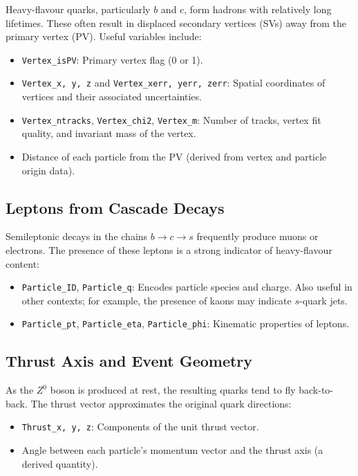 \documentclass[11pt]{article}
\begin{document}
Heavy-flavour quarks, particularly \( b \) and \( c \), form hadrons with relatively long lifetimes. These often result in displaced secondary vertices (SVs) away from the primary vertex (PV). Useful variables include:
\begin{itemize}
  \item \texttt{Vertex\_isPV}: Primary vertex flag (0 or 1).
  \item \texttt{Vertex\_x, y, z} and \texttt{Vertex\_xerr, yerr, zerr}: Spatial coordinates of vertices and their associated uncertainties.
  \item \texttt{Vertex\_ntracks}, \texttt{Vertex\_chi2}, \texttt{Vertex\_m}: Number of tracks, vertex fit quality, and invariant mass of the vertex.
  \item Distance of each particle from the PV (derived from vertex and particle origin data).
\end{itemize}

\subsection{Leptons from Cascade Decays}

Semileptonic decays in the chains \( b \rightarrow c \rightarrow s \) frequently produce muons or electrons. The presence of these leptons is a strong indicator of heavy-flavour content:
\begin{itemize}
  \item \texttt{Particle\_ID}, \texttt{Particle\_q}: Encodes particle species and charge. Also useful in other contexts; for example, the presence of kaons may indicate \( s \)-quark jets.
  \item \texttt{Particle\_pt}, \texttt{Particle\_eta}, \texttt{Particle\_phi}: Kinematic properties of leptons.
\end{itemize}

\subsection{Thrust Axis and Event Geometry}

As the \( Z^0 \) boson is produced at rest, the resulting quarks tend to fly back-to-back. The thrust vector approximates the original quark directions:
\begin{itemize}
  \item \texttt{Thrust\_x, y, z}: Components of the unit thrust vector.
  \item Angle between each particle’s momentum vector and the thrust axis (a derived quantity).
\end{itemize}
\end{document}
